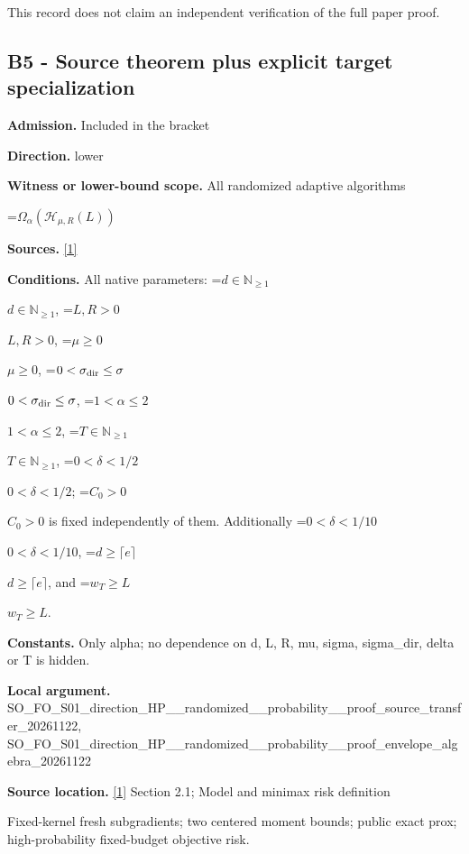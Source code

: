 \documentclass[10pt,a4paper]{article}
\newcommand{\AtlasMath}[1]{\par\begingroup\centering\setbox0=\hbox{$\displaystyle #1$}\ifdim\wd0>1.4\linewidth\typeout{ATLAS WIDE FORMULA: \the\wd0}\fi\ifdim\wd0>\linewidth\resizebox{\linewidth}{!}{\box0}\else\box0\fi\par\endgroup}
\newcommand{\AtlasInlineMath}[1]{\begingroup\setbox0=\hbox{$#1$}\ifdim\wd0>.4\linewidth\endgroup\AtlasMath{#1}\else\endgroup$#1$\fi}
\begin{document}
This record does not claim an independent verification of the full paper proof.



\subsection{B5 - Source theorem plus explicit target specialization}


\textbf{Admission.} Included in the bracket



\textbf{Direction.} lower



\textbf{Witness or lower-bound scope.} All randomized adaptive algorithms



\AtlasMath{\Omega_{\alpha}\!\left(\mathcal H_{\mu,R}(L)\right)}


\textbf{Sources.} \href{https://arxiv.org/html/2610.00260v2}{[1]}



\textbf{Conditions.} All native parameters: \AtlasInlineMath{d\in\mathbb N_{\ge1}}, \AtlasInlineMath{L,R>0}, \AtlasInlineMath{\mu\ge0}, \AtlasInlineMath{0<\sigma_{\rm dir}\le\sigma}, \AtlasInlineMath{1<\alpha\le2}, \AtlasInlineMath{T\in\mathbb N_{\ge1}}, \AtlasInlineMath{0<\delta<1/2}; \AtlasInlineMath{C_0>0} is fixed independently of them. Additionally \AtlasInlineMath{0<\delta<1/10}, \AtlasInlineMath{d\ge\lceil e\rceil}, and \AtlasInlineMath{w_T\ge L}.



\textbf{Constants.} Only alpha; no dependence on d, L, R, mu, sigma, sigma\_dir, delta or T is hidden.



\textbf{Local argument.} SO\_FO\_S01\_direction\_HP\_\_\allowbreak{}randomized\_\_probability\_\allowbreak{}\_proof\_source\_transfer\_2\allowbreak{}0261122, SO\_FO\_S01\_direction\_HP\_\_\allowbreak{}randomized\_\_probability\_\allowbreak{}\_proof\_envelope\_algebra\_\allowbreak{}20261122



\textbf{Source location.} \href{https://arxiv.org/html/2610.00260v2}{[1]} Section 2.1; Model and minimax risk definition



Fixed-kernel fresh subgradients; two centered moment bounds; public exact prox; high-probability fixed-budget objective risk.
\end{document}
